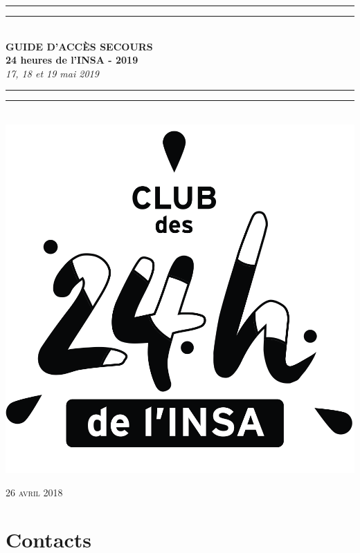 \documentclass[hidelinks, paper=a4, fontsize=13pt]{report}
\begin{document}
\begin{center}
	\rule[0.5ex]{\linewidth}{2pt}\vspace*{-\baselineskip}\vspace*{3.2pt}
	\rule[0.5ex]{\linewidth}{1pt}\\[\baselineskip]
	\huge \textbf{GUIDE D'ACCÈS SECOURS\\24 heures de l'INSA - 2019} \\[4mm]
	{\Large \textit{17, 18 et 19 mai 2019}}\\
	\rule[0.5ex]{\linewidth}{1pt}\vspace*{-\baselineskip}\vspace{3.2pt}
	\rule[0.5ex]{\linewidth}{2pt}\\
	\vspace{30mm}
	\includegraphics[scale=0.3]{Annexes/Images_Acces/logo24h}\\
	
	\vspace{50mm}

\end{center}
	\begin{flushright}
		{\large\textsc{26 avril 2018}}
\end{flushright}

\chapter*{Contacts}
\end{document}
